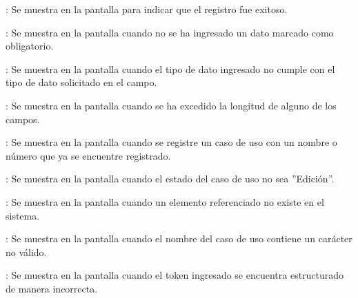 \begin{Citemize}
	\item {}: Se muestra en la pantalla  para indicar que el registro fue exitoso.
	\item {}: Se muestra en la pantalla  cuando no se ha ingresado un dato marcado como obligatorio.
	\item {}: Se muestra en la pantalla  cuando el tipo de dato ingresado no cumple con el tipo de dato solicitado en el campo.
	\item {}: Se muestra en la pantalla  cuando se ha excedido la longitud de alguno de los campos.
	\item {}: Se muestra en la pantalla  cuando se registre un caso de uso con un nombre o número que ya se encuentre registrado.
	\item {}: Se muestra en la pantalla  cuando el estado del caso de uso no sea ''Edición''.
	\item {}: Se muestra en la pantalla  cuando un elemento referenciado no existe en el sistema.
	\item {}: Se muestra en la pantalla  cuando el nombre del caso de uso contiene un carácter no válido.
	\item {}: Se muestra en la pantalla  cuando el token ingresado se encuentra estructurado de manera incorrecta.
\end{Citemize}
